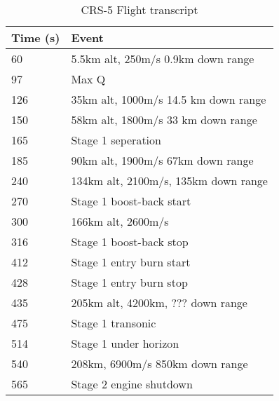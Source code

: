 \begin{table}[!htb]
\centering
\begin{tabular}{|l|l|}
\hline
\rowcolor[HTML]{C0C0C0} 
Time (s) & Event                                \\ \hline
60       & 5.5km alt, 250m/s 0.9km down range   \\ \hline
\rowcolor[HTML]{EFEFEF} 
97       & Max Q                                \\ \hline
126      & 35km alt, 1000m/s 14.5 km down range \\ \hline
\rowcolor[HTML]{EFEFEF} 
150      & 58km alt, 1800m/s 33 km down range   \\ \hline
165      & Stage 1 seperation                   \\ \hline
\rowcolor[HTML]{EFEFEF} 
185      & 90km alt, 1900m/s 67km down range    \\ \hline
240      & 134km alt, 2100m/s, 135km down range \\ \hline
\rowcolor[HTML]{EFEFEF} 
270      & Stage 1 boost-back start             \\ \hline
300      & 166km alt, 2600m/s                   \\ \hline
\rowcolor[HTML]{EFEFEF} 
316      & Stage 1 boost-back stop              \\ \hline
412      & Stage 1 entry burn start             \\ \hline
\rowcolor[HTML]{EFEFEF} 
428      & Stage 1 entry burn stop              \\ \hline
435      & 205km alt, 4200km, ??? down range    \\ \hline
\rowcolor[HTML]{EFEFEF} 
475      & Stage 1 transonic                    \\ \hline
514      & Stage 1 under horizon                \\ \hline
\rowcolor[HTML]{EFEFEF} 
540      & 208km, 6900m/s 850km down range      \\ \hline
565      & Stage 2 engine shutdown              \\ \hline
\end{tabular}
\caption{CRS-5 Flight transcript \cite{CRS5}}
\label{tab:CRS5}
\end{table}

